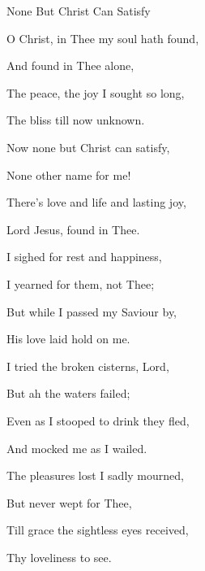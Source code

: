 \documentclass[12pt]{book}
\begin{document}
\begin{song}{None But Christ Can Satisfy}{}
  {\SBPubDom}
  {}
  {}
  {}

  \begin{SBVerse}
    O Christ, in Thee my soul hath found,

    And found in Thee alone,

    The peace, the joy I sought so long,

    The bliss till now unknown.
  \end{SBVerse}

  \begin{SBOpGroup}
    Now none but Christ can satisfy,

    None other name for me!

    There's love and life and lasting joy,

    Lord Jesus, found in Thee.
  \end{SBOpGroup}

  \begin{SBVerse}
    I sighed for rest and happiness,

    I yearned for them, not Thee;

    But while I passed my Saviour by,

    His love laid hold on me.
  \end{SBVerse}

  \begin{SBVerse}
    I tried the broken cisterns, Lord,

    But ah the waters failed;

    Even as I stooped to drink they fled,

    And mocked me as I wailed.
  \end{SBVerse}

  \begin{SBVerse}
    The pleasures lost I sadly mourned,

    But never wept for Thee,

    Till grace the sightless eyes received,

    Thy loveliness to see.
  \end{SBVerse}
\end{song}
\end{document}
